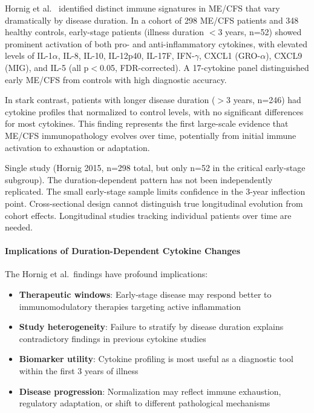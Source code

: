 \begin{achievement}
\label{ach:cytokine-duration}
Hornig et al.~\cite{Hornig2015} identified distinct immune signatures in ME/CFS that vary dramatically by disease duration. In a cohort of 298 ME/CFS patients and 348 healthy controls, early-stage patients (illness duration $<$3 years, n=52) showed prominent activation of both pro- and anti-inflammatory cytokines, with elevated levels of IL-1$\alpha$, IL-8, IL-10, IL-12p40, IL-17F, IFN-$\gamma$, CXCL1 (GRO-$\alpha$), CXCL9 (MIG), and IL-5 (all p$<$0.05, FDR-corrected). A 17-cytokine panel distinguished early ME/CFS from controls with high diagnostic accuracy.

In stark contrast, patients with longer disease duration ($>$3 years, n=246) had cytokine profiles that normalized to control levels, with no significant differences for most cytokines. This finding represents the first large-scale evidence that ME/CFS immunopathology evolves over time, potentially from initial immune activation to exhaustion or adaptation.
\end{achievement}

\begin{warning}
Single study (Hornig 2015, n=298 total, but only n=52 in the critical early-stage subgroup). The duration-dependent pattern has not been independently replicated. The small early-stage sample limits confidence in the 3-year inflection point. Cross-sectional design cannot distinguish true longitudinal evolution from cohort effects. Longitudinal studies tracking individual patients over time are needed.
\end{warning}

\paragraph{Implications of Duration-Dependent Cytokine Changes}

The Hornig et al.\ findings have profound implications:

\begin{itemize}
    \item \textbf{Therapeutic windows}: Early-stage disease may respond better to immunomodulatory therapies targeting active inflammation
    \item \textbf{Study heterogeneity}: Failure to stratify by disease duration explains contradictory findings in previous cytokine studies
    \item \textbf{Biomarker utility}: Cytokine profiling is most useful as a diagnostic tool within the first 3 years of illness
    \item \textbf{Disease progression}: Normalization may reflect immune exhaustion, regulatory adaptation, or shift to different pathological mechanisms
\end{itemize}

